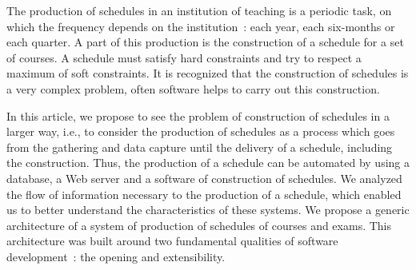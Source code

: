 The production of schedules in an institution of teaching is a
periodic task, on which the frequency depends on the institution~:
each year, each six-months or each quarter. A part of this
production is the construction of a schedule for a set of courses.
A schedule must satisfy hard constraints and try to respect a
maximum of soft constraints. It is recognized that the
construction of schedules is a very complex problem, often
software helps to carry out this construction.

In this article, we propose to see the problem of construction of
schedules in a larger way, i.e., to consider the production of
schedules as a process which goes from the gathering and data
capture until the delivery of a schedule, including the
construction. Thus, the production of a schedule can be automated
by using a database, a Web server and a software of construction
of schedules. We analyzed the flow of information necessary to the
production of a schedule, which enabled us to better understand
the characteristics of these systems. We propose a generic
architecture of a system of production of schedules of courses and
exams. This architecture was built around two fundamental
qualities of software development~: the opening and extensibility.
